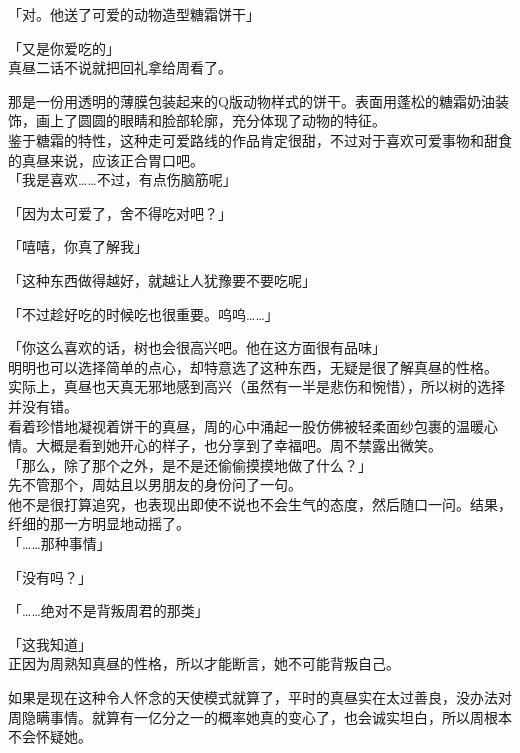 「对。他送了可爱的动物造型糖霜饼干」

「又是你爱吃的」\\

真昼二话不说就把回礼拿给周看了。

那是一份用透明的薄膜包装起来的Q版动物样式的饼干。表面用蓬松的糖霜奶油装饰，画上了圆圆的眼睛和脸部轮廓，充分体现了动物的特征。\\

鉴于糖霜的特性，这种走可爱路线的作品肯定很甜，不过对于喜欢可爱事物和甜食的真昼来说，应该正合胃口吧。\\

「我是喜欢……不过，有点伤脑筋呢」

「因为太可爱了，舍不得吃对吧？」

「嘻嘻，你真了解我」

「这种东西做得越好，就越让人犹豫要不要吃呢」

「不过趁好吃的时候吃也很重要。呜呜……」

「你这么喜欢的话，树也会很高兴吧。他在这方面很有品味」\\

明明也可以选择简单的点心，却特意选了这种东西，无疑是很了解真昼的性格。\\

实际上，真昼也天真无邪地感到高兴（虽然有一半是悲伤和惋惜），所以树的选择并没有错。\\

看着珍惜地凝视着饼干的真昼，周的心中涌起一股仿佛被轻柔面纱包裹的温暖心情。大概是看到她开心的样子，也分享到了幸福吧。周不禁露出微笑。\\

「那么，除了那个之外，是不是还偷偷摸摸地做了什么？」\\

先不管那个，周姑且以男朋友的身份问了一句。\\

他不是很打算追究，也表现出即使不说也不会生气的态度，然后随口一问。结果，纤细的那一方明显地动摇了。\\

「……那种事情」

「没有吗？」

「……绝对不是背叛周君的那类」

「这我知道」\\

正因为周熟知真昼的性格，所以才能断言，她不可能背叛自己。

如果是现在这种令人怀念的天使模式就算了，平时的真昼实在太过善良，没办法对周隐瞒事情。就算有一亿分之一的概率她真的变心了，也会诚实坦白，所以周根本不会怀疑她。\\


